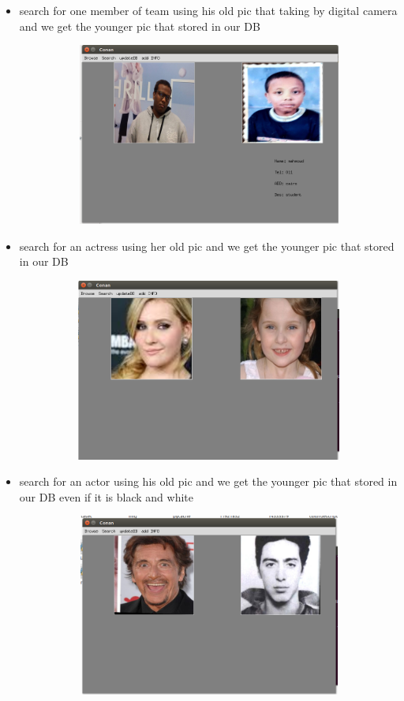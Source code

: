 \documentclass[pdftex,10pt,a4paper,oneside]{article}
\begin{document}
\begin{itemize}
\begin{figure}[H]
		\end{figure}
	\pagebreak
		\item search for one member of team  using his old pic  that taking by digital camera and we get the younger pic that stored in our DB
	\begin{figure}[H]
	\centering
	\includegraphics[width=120mm,height=60mm]{fig/16.png}
\end{figure}
	\item search for an actress using her old pic and we get the younger pic that stored in our DB
	\begin{figure}[H]
	\centering
	\includegraphics[width=120mm,height=60mm]{fig/10.png}
\end{figure}
\pagebreak
	\item search for an actor  using his old pic and we get the younger pic that stored in our DB even if it is black and white
	\begin{figure}[H]
	\centering
	\includegraphics[width=120mm,height=60mm]{fig/11.png}

\end{figure}
\end{itemize}
\end{document}
